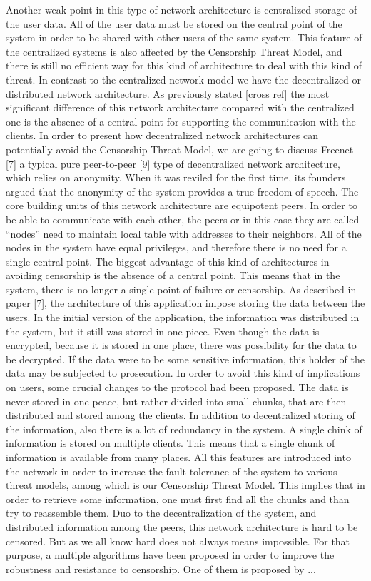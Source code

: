 Another weak point in this type of network architecture is centralized storage of the user data. All of the user data must be stored on the central point of the system in order to be shared with other users of the same system. This feature of the centralized systems is also affected by the Censorship Threat Model, and there is still no efficient way for this kind of architecture to deal with this kind of threat.
In contrast to the centralized network model we have the decentralized or distributed network architecture. As previously stated [cross ref] the most significant difference of this network architecture compared with the centralized one is the absence of a central point for supporting the communication with the clients. In order to present how decentralized network architectures can potentially avoid the Censorship Threat Model, we are going to discuss Freenet [7] a typical pure peer-to-peer [9] type of decentralized network architecture, which relies on anonymity. When it was reviled for the first time, its founders argued that the anonymity of the system provides a true freedom of speech. The core building units of this network architecture are equipotent peers. In order to be able to communicate with each other, the peers or in this case they are called “nodes” need to maintain local table with addresses to their neighbors. All of the nodes in the system have equal privileges, and therefore there is no need for a single central point. The biggest advantage of this kind of architectures in avoiding censorship is the absence of a central point. This means that in the system, there is no longer a single point of failure or censorship.  As described in paper [7], the architecture of this application impose storing the data between the users. In the initial version of the application, the information was distributed in the system, but it still was stored in one piece. Even though the data is encrypted, because it is stored in one place, there was possibility for the data to be decrypted. If the data were to be some sensitive information, this holder of the data may be subjected to prosecution. In order to avoid this kind of implications on users, some crucial changes to the protocol had been proposed. The data is never stored in one peace, but rather divided into small chunks, that are then distributed and stored among the clients. In addition to decentralized storing of the information, also there is a lot of redundancy in the system. A single chink of information is stored on multiple clients. This means that a single chunk of information is available from many places. All this features are introduced into the network in order to increase the fault tolerance of the system to various threat models, among which is our Censorship Threat Model. This implies that in order to retrieve some information, one must first find all the chunks and than try to reassemble them. Duo to the decentralization of the system, and distributed information among the peers, this network architecture is hard to be censored. But as we all know hard does not always means impossible. For that purpose, a multiple algorithms have been proposed in order to improve the robustness and resistance to censorship. One of them is proposed by ...
